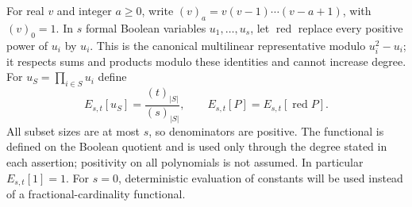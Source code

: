For real $v$ and integer $a\ge0$, write
$(v)_a=v(v-1)\cdots(v-a+1)$, with $(v)_0=1$.
In $s$ formal Boolean variables $u_1,\ldots,u_s$, let $\operatorname{red}$
replace every positive power of $u_i$ by $u_i$. This is the canonical
multilinear representative modulo $u_i^2-u_i$; it respects sums and
products modulo these identities and cannot increase degree. For
$u_S=\prod_{i\in S}u_i$ define
\begin{equation}\label{eq:fractional-moments}
 E_{s,t}[u_S]=\frac{(t)_{|S|}}{(s)_{|S|}},\qquad
 E_{s,t}[P]=E_{s,t}[\operatorname{red}P].
\end{equation}
All subset sizes are at most $s$, so denominators are positive. The
functional is defined on the Boolean quotient and is used only through
the degree stated in each assertion; positivity on all polynomials is not
assumed. In particular $E_{s,t}[1]=1$. For $s=0$, deterministic evaluation
of constants will be used instead of a fractional-cardinality functional.

